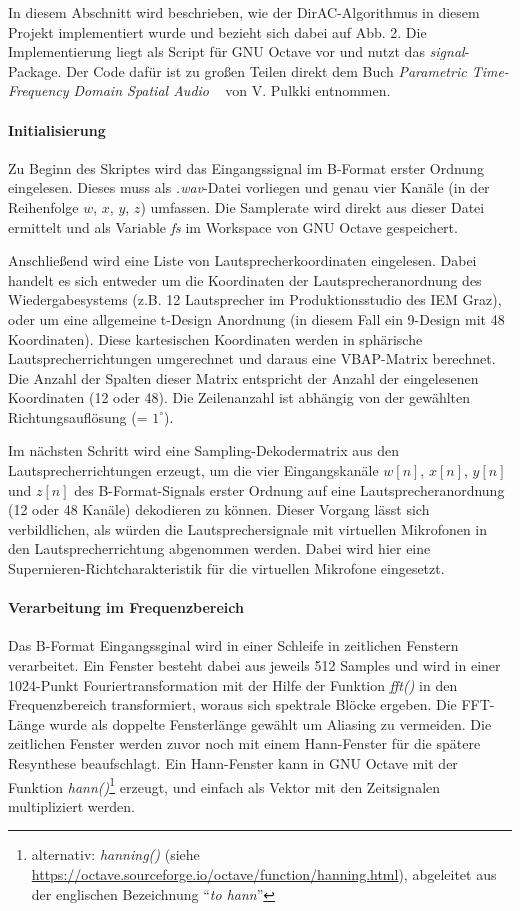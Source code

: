 In diesem Abschnitt wird beschrieben, wie der DirAC-Algorithmus in diesem Projekt implementiert wurde und bezieht sich dabei auf Abb. 2. Die Implementierung liegt als Script für GNU Octave vor und nutzt das \textit{signal}-Package. Der Code dafür ist zu großen Teilen direkt dem Buch \textit{Parametric Time-Frequency Domain Spatial Audio} ~\cite{spatial-book} von V. Pulkki entnommen.

\paragraph{Initialisierung}
Zu Beginn des Skriptes wird das Eingangssignal im B-Format erster Ordnung eingelesen. Dieses muss als \textit{.wav}-Datei vorliegen und genau vier Kanäle (in der Reihenfolge $w$, $x$, $y$, $z$) umfassen. Die Samplerate wird direkt aus dieser Datei ermittelt und als Variable \textit{fs} im Workspace von GNU Octave gespeichert.

Anschließend wird eine Liste von Lautsprecherkoordinaten eingelesen. Dabei handelt es sich entweder um die Koordinaten der Lautsprecheranordnung des Wiedergabesystems (z.B. 12 Lautsprecher im Produktionsstudio des IEM Graz), oder um eine allgemeine t-Design Anordnung (in diesem Fall ein 9-Design mit 48 Koordinaten). Diese kartesischen Koordinaten werden in sphärische Lautsprecherrichtungen umgerechnet und daraus eine VBAP-Matrix berechnet. Die Anzahl der Spalten dieser Matrix entspricht der Anzahl der eingelesenen Koordinaten (12 oder 48). Die Zeilenanzahl ist abhängig von der gewählten Richtungsauflösung (= $1^{\circ}$). %

Im nächsten Schritt wird eine Sampling-Dekodermatrix \cite{ambi-book} aus den Lautsprecherrichtungen erzeugt, um die vier Eingangskanäle $w[n]$, $x[n]$, $y[n]$ und $z[n]$ des B-Format-Signals erster Ordnung auf eine Lautsprecheranordnung (12 oder 48 Kanäle) dekodieren zu können.
Dieser Vorgang lässt sich verbildlichen, als würden die Lautsprechersignale mit virtuellen Mikrofonen in den Lautsprecherrichtung abgenommen werden. Dabei wird hier eine Supernieren-Richtcharakteristik für die virtuellen Mikrofone eingesetzt.

\paragraph{Verarbeitung im Frequenzbereich}
Das B-Format Eingangssginal wird in einer Schleife in zeitlichen Fenstern verarbeitet. Ein Fenster besteht dabei aus jeweils 512 Samples und wird in einer 1024-Punkt Fouriertransformation mit der Hilfe der Funktion \textit{fft()} in den Frequenzbereich transformiert, woraus sich spektrale Blöcke ergeben. Die FFT-Länge wurde als doppelte Fensterlänge gewählt um Aliasing zu vermeiden. Die zeitlichen Fenster werden zuvor noch mit einem Hann-Fenster für die spätere Resynthese beaufschlagt. Ein Hann-Fenster kann in GNU Octave mit der Funktion \textit{hann()}\footnote{alternativ: \textit{hanning()} (siehe \url{https://octave.sourceforge.io/octave/function/hanning.html}), abgeleitet aus der englischen Bezeichnung ``\textit{to hann}''} erzeugt, und einfach als Vektor mit den Zeitsignalen multipliziert werden.